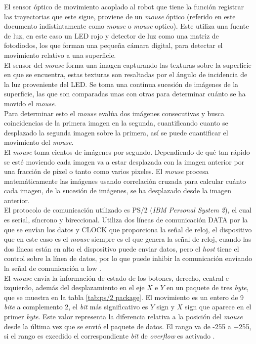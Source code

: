 \documentclass{iccmemoria}
\begin{document}
El sensor óptico de movimiento acoplado al robot que tiene la función registrar las trayectorias que este sigue, proviene de un \emph{mouse} óptico (referido en este documento indistintamente como \emph{mouse} o \emph{mouse} optico). Este utiliza una fuente de luz, en este caso un LED rojo y detector de luz como una matriz de fotodiodos, los que forman una pequeña cámara digital, para detectar el movimiento relativo a una superficie.\\

El sensor del \emph{mouse} forma una imagen capturando las texturas sobre la superficie en que se encuentra, estas texturas son resaltadas por el ángulo de incidencia de la luz proveniente del LED. Se toma una continua sucesión de imágenes de la superficie, las que son comparadas unas con otras para determinar cuánto se ha movido el \emph{mouse}.\\

Para determinar esto el \emph{mouse} evalúa dos imágenes consecutivas y busca coincidencias de la primera imagen en la segunda, cuantificando cuanto se desplazado la segunda imagen sobre la primera, así se puede cuantificar el movimiento del \emph{mouse}.\\

El \emph{mouse} toma cientos de imágenes por segundo. Dependiendo de qué tan rápido se esté moviendo cada imagen va a estar desplazada con la imagen anterior por una fracción de pixel o tanto como varios pixeles. El \emph{mouse} procesa matemáticamente las imágenes usando correlación cruzada para calcular cuánto cada imagen, de la sucesión de imágenes, se ha desplazado desde la imagen anterior.\\

El protocolo de comunicación utilizado es PS/2 (\emph{IBM Personal System 2}), el cual es serial, síncrono y bireccional. Utiliza dos líneas de comunicación DATA por la que se envían los datos y CLOCK que proporciona la señal de reloj, el dispositivo que en este caso es el \emph{mouse} siempre es el que genera la señal de reloj, cuando las dos líneas están en alto el dispositivo puede enviar datos, pero el \emph{host} tiene el control sobre la línea de datos, por lo que puede inhibir la comunicación enviando la señal de comunicación a low \cite{ps2protocol}.\\

El \emph{mouse} envía la información de estado de los botones, derecho, central e izquierdo, además del desplazamiento en el eje $X$ e $Y$ en un paquete de tres \emph{byte}, que se muestra en la tabla \ref{tab:ps/2 package}. El movimiento es un entero de 9 \emph{bite} a complemento 2, el \emph{bit} más significativo es $Y$ sign y $X$ sign que aparece en el primer \emph{byte}. Este valor representa la diferencia relativa a la posición del \emph{mouse} desde la última vez que se envió el paquete de datos. El rango va de -255 a +255, si el rango es excedido el correspondiente \emph{bit} de \emph{overflow} es activado \cite{ps2mouse}.\\
\end{document}
